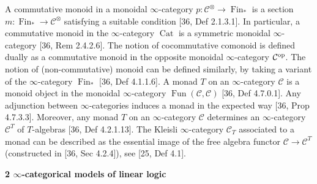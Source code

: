 A commutative monoid in a monoidal $\infty$-category $p:\mathcal{C}^{\otimes}\to\operatorname{Fin}_{\ast}$ is a section $m:\operatorname{Fin}_{\ast}\to\mathcal{C}^{\otimes}$ satisfying a suitable condition [36, Def 2.1.3.1]. In particular, a commutative monoid in the $\infty$-category $\operatorname{Cat}$ is a symmetric monoidal $\infty$-category [36, Rem 2.4.2.6]. The notion of cocommutative comonoid is defined dually as a commutative monoid in the opposite monoidal $\infty$-category $\mathcal{C}^{\textnormal{op}}$. The notion of (non-commutative) monoid can be defined similarly, by taking a variant of the $\infty$-category $\operatorname{Fin}_{\ast}$ [36, Def 4.1.1.6]. A monad $T$ on an $\infty$-category $\mathcal{C}$ is a monoid object in the monoidal $\infty$-category $\operatorname{Fun}(\mathcal{C},\mathcal{C})$ [36, Def 4.7.0.1]. Any adjunction between $\infty$-categories induces a monad in the expected way [36, Prop 4.7.3.3]. Moreover, any monad $T$ on an $\infty$-category $\mathcal{C}$ determines an $\infty$-category $\mathcal{C}^{T}$ of $T$-algebras [36, Def 4.2.1.13]. The Kleisli $\infty$-category $\mathcal{C}_{T}$ associated to a monad can be described as the essential image of the free algebra functor $\mathcal{C}\to\mathcal{C}^{T}$ (constructed in [36, Sec 4.2.4]), see [25, Def 4.1].\par
 
 
 


 
\par\medskip\noindent\textbf{2 $\infty$-categorical models of linear logic}\par
 
 
